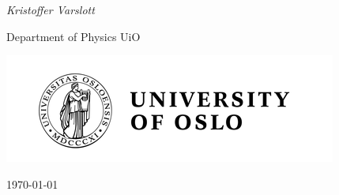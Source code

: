 \documentclass[twoside,onecolumn]{article}
\begin{document}
\begin{titlepage}
	\vspace{0.5\baselineskip} %
	\textit{Kristoffer Varslott \\} %
	\vspace{0.5\baselineskip} %
	
	\bigskip
	
	Department of Physics UiO %
	
	\bigskip
	\bigskip
	\bigskip
	\bigskip
	\bigskip
	\bigskip
	\bigskip
	\graphicspath{{Pictures/}} %
	\includegraphics[scale = 0.7]{University.png}
	\vfill %
	\bigskip
	\bigskip	
	\bigskip
	\bigskip
	\bigskip
	\bigskip
	\vspace{0.3\baselineskip} %
	
	\today

\end{titlepage}





\end{document}

